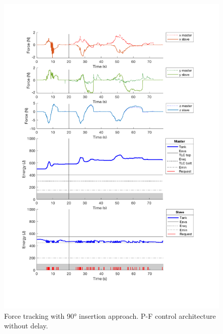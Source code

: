 \begin{center}
	\begin{figure}
		\includegraphics[width=\textwidth, keepaspectratio]{plots/pf90/Force.pdf}
		\caption{Force tracking with 90° insertion approach. P-F control architecture without delay.}
		\label{graph:pf90/Force}
	\end{figure}
\end{center}
\newpage

